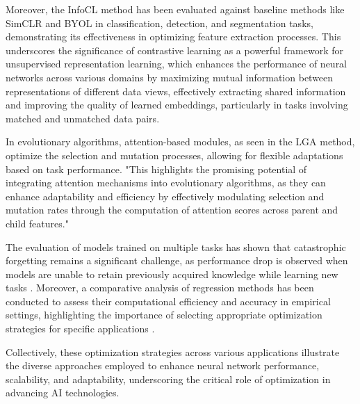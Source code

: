Moreover, the InfoCL method has been evaluated against baseline methods like SimCLR and BYOL in classification, detection, and segmentation tasks, demonstrating its effectiveness in optimizing feature extraction processes. This underscores the significance of contrastive learning as a powerful framework for unsupervised representation learning, which enhances the performance of neural networks across various domains by maximizing mutual information between representations of different data views, effectively extracting shared information and improving the quality of learned embeddings, particularly in tasks involving matched and unmatched data pairs. \cite{zhang2024universaladversarialperturbationsvisionlanguage,wang2022rethinkingminimalsufficientrepresentation} 



In evolutionary algorithms, attention-based modules, as seen in the LGA method, optimize the selection and mutation processes, allowing for flexible adaptations based on task performance. "This highlights the promising potential of integrating attention mechanisms into evolutionary algorithms, as they can enhance adaptability and efficiency by effectively modulating selection and mutation rates through the computation of attention scores across parent and child features." \cite{lange2023discoveringattentionbasedgeneticalgorithms} 



The evaluation of models trained on multiple tasks has shown that catastrophic forgetting remains a significant challenge, as performance drop is observed when models are unable to retain previously acquired knowledge while learning new tasks \cite{goldfarb2022analysiscatastrophicforgettingrandom}. Moreover, a comparative analysis of regression methods has been conducted to assess their computational efficiency and accuracy in empirical settings, highlighting the importance of selecting appropriate optimization strategies for specific applications \cite{kun2022mathematicalfoundationsregressionmethods}.



Collectively, these optimization strategies across various applications illustrate the diverse approaches employed to enhance neural network performance, scalability, and adaptability, underscoring the critical role of optimization in advancing AI technologies.






